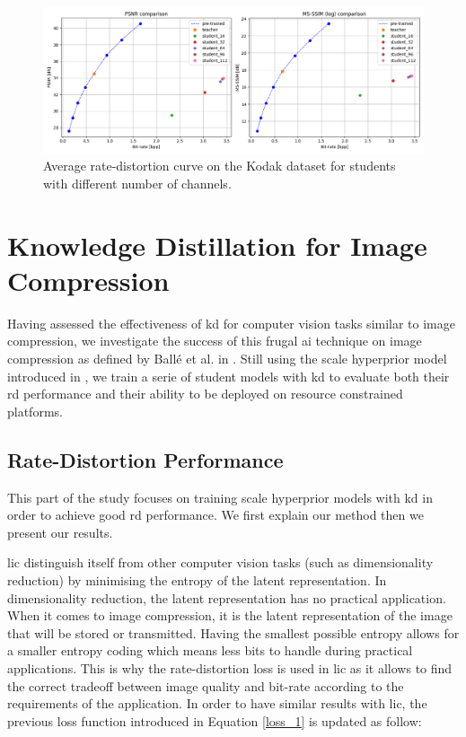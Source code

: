 \begin{figure}
    \centering
    \includegraphics[width=15cm]{img/kd_ae_3.png}
    \caption[Average rate-distortion curve on the Kodak dataset for students with different number of channels.]{Average rate-distortion curve on the Kodak dataset for students with different number of channels.}
    \label{kd_ae_2}
\end{figure}

\section{Knowledge Distillation for Image Compression}
Having assessed the effectiveness of \acrshort{kd} for computer vision tasks similar to image compression, we investigate the success of this frugal \acrshort{ai} technique on image compression as defined by Ballé et al. in \cite{ballé2016endtoendoptimizationnonlineartransform}. Still using the scale hyperprior model introduced in \cite{ballé2018variationalimagecompressionscale}, we train a serie of student models with \acrshort{kd} to evaluate both their \acrshort{rd} performance and their ability to be deployed on resource constrained platforms.

\subsection{Rate-Distortion Performance}
This part of the study focuses on training scale hyperprior models with \acrshort{kd} in order to achieve good \acrshort{rd} performance. We first explain our method then we present our results.

\acrshort{lic} distinguish itself from other computer vision tasks (such as dimensionality reduction) by minimising the entropy of the latent representation. In dimensionality reduction, the latent representation has no practical application. When it comes to image compression, it is the latent representation of the image that will be stored or transmitted. Having the smallest possible entropy allows for a smaller entropy coding which means less bits to handle during practical applications. This is why the rate-distortion loss is used in \acrshort{lic} as it allows to find the correct tradeoff between image quality and bit-rate according to the requirements of the application. In order to have similar results with \acrshort{lic}, the previous loss function introduced in Equation \eqref{loss_1} is updated as follow:

